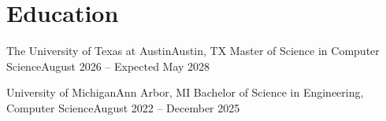 \section{Education}
\resumeSubHeadingListStart

    \resumeSubheading
    {The University of Texas at Austin}{Austin, TX}
    {Master of Science in Computer Science}{August 2026 -- Expected May 2028}

    \resumeSubheading
    {University of Michigan}{Ann Arbor, MI}
    {Bachelor of Science in Engineering, Computer Science}{August 2022 -- December 2025}

\resumeSubHeadingListEnd
